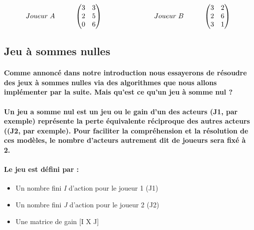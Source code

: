 \documentclass[a4paper, 12pt, twoside]{article}
\begin{document}
\[
Joueur\hspace{0,1cm} A\hspace{1cm}
\begin{pmatrix}3&3\\
2&5\\
0&6\\
\end{pmatrix}\                      \hspace{2,5cm}  
Joueur\hspace{0,1cm} B \hspace{1cm}  
\begin{pmatrix}3&2\\
2&6\\
3&1\\
\end{pmatrix} 
\]
\subsection{Jeu à sommes nulles}
\paragraph{Comme annoncé dans notre introduction nous essayerons de résoudre des jeux à sommes nulles via des algorithmes que nous allons implémenter par la suite. Mais qu'est ce qu'un jeu à somme nul ? }
\paragraph{Un jeu a somme nul est un jeu ou le gain d'un des acteurs (J1, par exemple) représente la perte équivalente réciproque des autres acteurs ((J2, par exemple). Pour faciliter la compréhension et la résolution de ces modèles, le nombre d'acteurs autrement dit de joueurs sera fixé à 2.}
\paragraph{Le jeu est défini par : }
\begin{itemize}
\item Un nombre fini \textit{I} d'action pour le joueur 1 (J1)
\item Un nombre fini \textit{J} d'action pour le joueur 2 (J2)
\item Une matrice de gain [I X J]
\end{itemize}




\newpage
\end{document}
